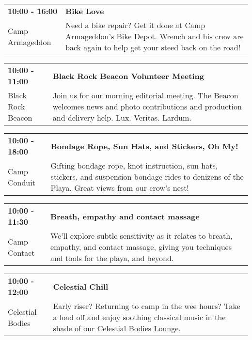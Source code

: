 \begin{tabular}{ p{1in} p{2.2in} }
    \textbf{10:00 - 16:00} & \textbf{Bike Love} \\
    Camp Armageddon \newline  & Need a bike repair? Get it done at Camp Armageddon's Bike Depot. Wrench and his crew are back again to help get your steed back on the road! \\
    \hline 
\end{tabular}
    
\begin{tabular}{ p{1in} p{2.2in} }
    \textbf{10:00 - 11:00} & \textbf{Black Rock Beacon Volunteer Meeting} \\
    Black Rock Beacon \newline  & Join us for our morning editorial meeting. The Beacon welcomes news and photo contributions and production and delivery help. Lux. Veritas. Lardum. \\
    \hline 
\end{tabular}
    
\begin{tabular}{ p{1in} p{2.2in} }
    \textbf{10:00 - 18:00} & \textbf{Bondage Rope, Sun Hats, and Stickers, Oh My!} \\
    Camp Conduit \newline  & Gifting bondage rope, knot instruction, sun hats, stickers, and suspension bondage rides to denizens of the Playa. Great views from our crow's nest! \\
    \hline 
\end{tabular}
    
\begin{tabular}{ p{1in} p{2.2in} }
    \textbf{10:00 - 11:30} & \textbf{Breath, empathy and contact massage} \\
    Camp Contact \newline  & We'll explore subtle sensitivity as it relates to breath, empathy, and contact massage, giving you techniques and tools for the playa, and beyond. \\
    \hline 
\end{tabular}
    
\begin{tabular}{ p{1in} p{2.2in} }
    \textbf{10:00 - 12:00} & \textbf{Celestial Chill} \\
    Celestial Bodies \newline  & Early riser? Returning to camp in the wee hours? Take a load off and enjoy soothing classical music in the shade of our Celestial Bodies Lounge. \\
    \hline 
\end{tabular}
    
